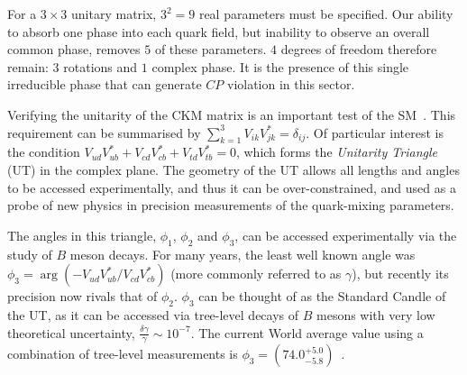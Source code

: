 \documentclass[oneside,12pt]{article}
\begin{document}
For a $3\times 3$ unitary matrix, $3^2=9$ real parameters must be specified. Our
ability to absorb one phase into each quark field, but inability to observe an
overall common phase, removes $5$ of these parameters. $4$ degrees of freedom
therefore remain: $3$ rotations and $1$ complex phase. It is the presence of
this single irreducible phase that can generate $CP$ violation in this sector.

Verifying the unitarity of the CKM matrix is an important test of the
SM~\cite{CKMTheory}. This requirement can be summarised by
$\sum_{k=1}^{3}V_{ik}V^*_{jk}=\delta_{ij}$. Of particular interest is the
condition $V_{ud}V^{*}_{ub}+V_{cd}V^{*}_{cb}+V_{td}V^{*}_{tb}=0$, which forms
the \emph{Unitarity Triangle} (UT) in the complex plane. The geometry of the UT
allows all lengths and angles to be accessed experimentally, and thus it can be
over-constrained, and used as a probe of new physics in precision measurements
of the quark-mixing parameters. 

The angles in this triangle, $\phi_1$, $\phi_2$ and $\phi_3$, can be accessed
experimentally via the study of $B$ meson decays. For many years, the least well
known angle was $\phi_3=\arg(-V_{ud}V^{*}_{ub}/V_{cd}V^{*}_{cb})$ (more commonly
referred to as $\gamma$), but recently its precision now rivals that of
$\phi_2$. $\phi_3$ can be thought of as the Standard Candle of the UT, as it can
be accessed via tree-level decays of $B$ mesons with very low theoretical
uncertainty, $\frac{\delta\gamma}{\gamma}\sim 10^{-7}$. The current World
average value using a combination of tree-level measurements is
$\phi_3=(74.0^{+5.0}_{-5.8})$\degree~\cite{LatestGamma}.
\end{document}
